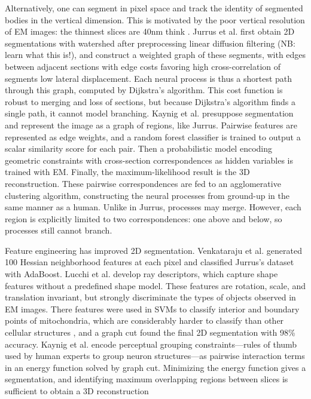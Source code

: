 \documentclass[draft,english]{article}
\newcommand{\+}[1]{\ensuremath{\boldsymbol{\mathrm{#1}}}}
\begin{document}
Alternatively, one can segment in pixel space and track the identity of segmented bodies in the vertical dimension. This is motivated by the poor vertical resolution of EM images: the thinnest slices are 40nm think \cite{Kaynig2010b, Briggman2006}. Jurrus et al. \cite{Jurrus2008} first obtain 2D segmentations with watershed after preprocessing linear diffusion filtering (NB: learn what this is!), and construct a weighted graph of these segments, with edges between adjacent sections with edge costs favoring high cross-correlation of segments low lateral displacement. Each neural process is thus a shortest path through this graph, computed by Dijkstra's algorithm. This cost function is robust to merging and loss of sections, but because Dijkstra's algorithm finds a single path, it cannot model branching. Kaynig et al. \cite{Kaynig2010a} presuppose segmentation and represent the image as a graph of regions, like Jurrus. Pairwise features are represented as edge weights, and a random forest classifier is trained to output a scalar similarity score for each pair. Then a probabilistic model encoding geometric constraints with cross-section correspondences as hidden variables is trained with EM. Finally, the maximum-likelihood result is the 3D reconstruction. These pairwise correspondences are fed to an agglomerative clustering algorithm, constructing the neural processes from ground-up in the same manner as a human. Unlike in Jurrus, processes may merge. However, each region is explicitly limited to two correspondences: one above and below, so processes still cannot branch.

Feature engineering has improved 2D segmentation. Venkataraju et al. \cite{Venkataraju2009} generated 100 Hessian neighborhood features at each pixel and classified Jurrus's dataset with AdaBoost. Lucchi et al. \cite{Lucchi2010} develop ray descriptors, which capture shape features without a predefined shape model. These features are rotation, scale, and translation invariant, but strongly discriminate the types of objects observed in EM images. There features were used in SVMs to classify interior and boundary points of mitochondria, which are considerably harder to classify than other cellular structures \cite{Kaynig2010b}, and a graph cut found the final 2D segmentation with 98\% accuracy. Kaynig et al. encode perceptual grouping constraints---rules of thumb used by human experts to group neuron structures---as pairwise interaction terms in an energy function solved by graph cut. Minimizing the energy function gives a segmentation, and identifying maximum overlapping regions between slices is sufficient to obtain a 3D reconstruction 
\end{document}
